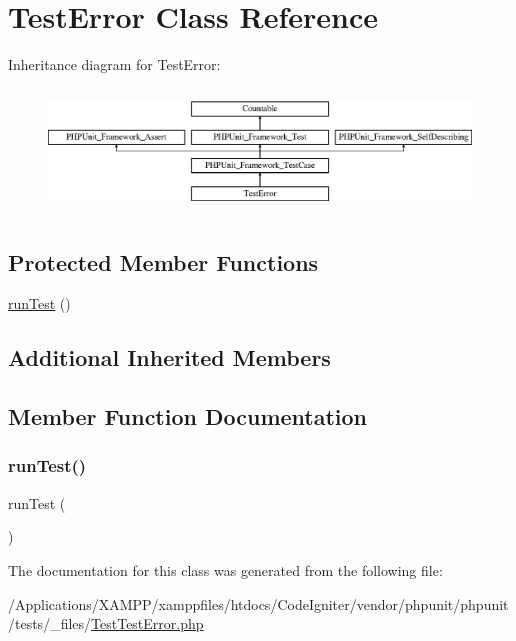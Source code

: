 \hypertarget{class_test_error}{}\section{Test\+Error Class Reference}
\label{class_test_error}
Inheritance diagram for Test\+Error\+:\begin{figure}[H]
\begin{center}
\leavevmode
\includegraphics[height=3.303835cm]{class_test_error}
\end{center}
\end{figure}
\subsection*{Protected Member Functions}
\begin{DoxyCompactItemize}
\item 
\mbox{\hyperlink{class_test_error_ad2541a093be4d619db04ed65d661a684}{run\+Test}} ()
\end{DoxyCompactItemize}
\subsection*{Additional Inherited Members}


\subsection{Member Function Documentation}
\mbox{\label{class_test_error_ad2541a093be4d619db04ed65d661a684}} 
\subsubsection{\texorpdfstring{run\+Test()}{runTest()}}
{\footnotesize\ttfamily run\+Test (\begin{DoxyParamCaption}{ }\end{DoxyParamCaption})\hspace{0.3cm}{\ttfamily [protected]}}



The documentation for this class was generated from the following file\+:\begin{DoxyCompactItemize}
\item 
/\+Applications/\+X\+A\+M\+P\+P/xamppfiles/htdocs/\+Code\+Igniter/vendor/phpunit/phpunit/tests/\+\_\+files/\mbox{\hyperlink{_test_test_error_8php}{Test\+Test\+Error.\+php}}\end{DoxyCompactItemize}
